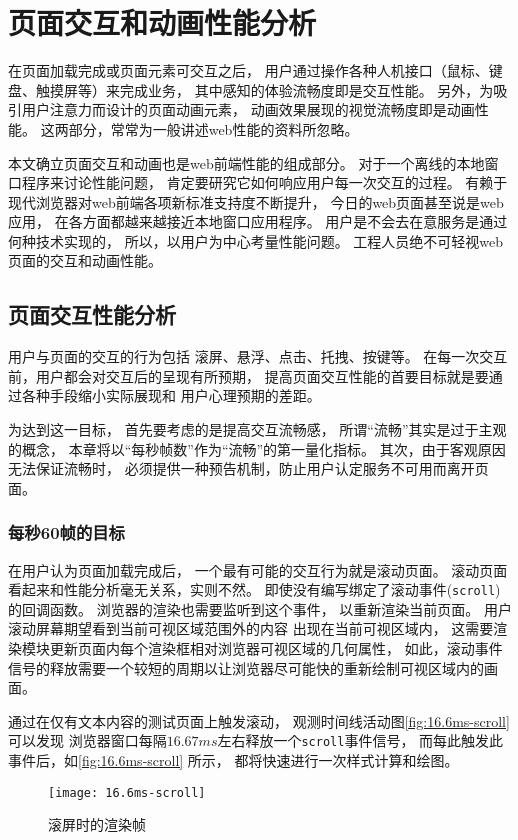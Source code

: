 \chapter{页面交互和动画性能分析}

在页面加载完成或页面元素可交互之后，
用户通过操作各种人机接口（鼠标、键盘、触摸屏等）来完成业务，
其中感知的体验流畅度即是交互性能。
另外，为吸引用户注意力而设计的页面动画元素，
动画效果展现的视觉流畅度即是动画性能。
这两部分，常常为一般讲述web性能的资料\cite{}所忽略。

本文确立页面交互和动画也是web前端性能的组成部分。
对于一个离线的本地窗口程序来讨论性能问题，
肯定要研究它如何响应用户每一次交互的过程。
有赖于现代浏览器对web前端各项新标准支持度不断提升，
今日的web页面甚至说是web应用，
在各方面都越来越接近本地窗口应用程序。
用户是不会去在意服务是通过何种技术实现的，
所以，以用户为中心考量性能问题。
工程人员绝不可轻视web页面的交互和动画性能。


\section{页面交互性能分析}

用户与页面的交互的行为包括
滚屏、悬浮、点击、托拽、按键等。
在每一次交互前，用户都会对交互后的呈现有所预期，
提高页面交互性能的首要目标就是要通过各种手段缩小实际展现和
用户心理预期的差距。

为达到这一目标，
首先要考虑的是提高交互流畅感，
所谓``流畅''其实是过于主观的概念，
本章将以``每秒帧数''作为``流畅''的第一量化指标。
其次，由于客观原因无法保证流畅时，
必须提供一种预告机制，防止用户认定服务不可用而离开页面。

\subsection{每秒60帧的目标}
在用户认为页面加载完成后，
一个最有可能的交互行为就是滚动页面。
滚动页面看起来和性能分析毫无关系，实则不然。
即使没有编写绑定了滚动事件(\texttt{scroll})的回调函数。
浏览器的渲染也需要监听到这个事件，
以重新渲染当前页面。
用户滚动屏幕期望看到当前可视区域范围外的内容
出现在当前可视区域内，
这需要渲染模块更新页面内每个渲染框相对浏览器可视区域的几何属性，
如此，滚动事件信号的释放需要一个较短的周期以让浏览器尽可能快的重新绘制可视区域内的画面。

通过在仅有文本内容的测试页面上触发滚动，
观测时间线活动图\autoref{fig:16.6ms-scroll} 可以发现
浏览器窗口每隔$16.67ms$左右释放一个\texttt{scroll}事件信号，
而每此触发此事件后，如\autoref{fig:16.6ms-scroll} 所示，
都将快速进行一次样式计算和绘图。
\begin{figure}[htbp]
	\centering
	\texttt{[image: 16.6ms-scroll]}
	\caption{滚屏时的渲染帧}\label{fig:16.6ms-scroll}
\end{figure}

